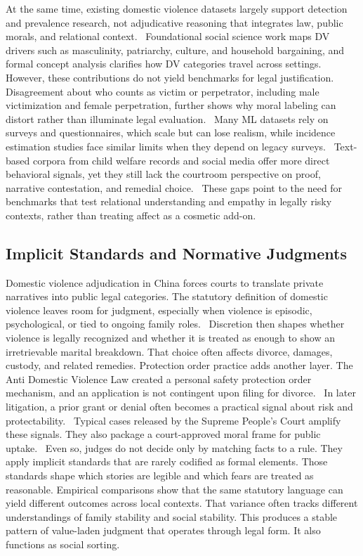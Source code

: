 \documentclass[pdflatex,sn-mathphys-ay]{sn-jnl}%
\theoremstyle{thmstyleone}%
\theoremstyle{thmstyletwo}%
\theoremstyle{thmstylethree}%
\begin{document}
At the same time, existing domestic violence datasets largely support detection and prevalence research, not adjudicative reasoning that integrates law, public morals, and relational context.~\cite{mshweshwe_understanding_2020} Foundational social science work maps DV drivers such as masculinity, patriarchy, culture, and household bargaining, and formal concept analysis clarifies how DV categories travel across settings. However, these contributions do not yield benchmarks for legal justification.~\cite{das_causes_2015} Disagreement about who counts as victim or perpetrator, including male victimization and female perpetration, further shows why moral labeling can distort rather than illuminate legal evaluation.~\cite{dutton_female_2005} Many ML datasets rely on surveys and questionnaires, which scale but can lose realism, while incidence estimation studies face similar limits when they depend on legacy surveys.~\cite{hossain_prediction_2021} Text-based corpora from child welfare records and social media offer more direct behavioral signals, yet they still lack the courtroom perspective on proof, narrative contestation, and remedial choice.~\cite{victor_automated_2021} These gaps point to the need for benchmarks that test relational understanding and empathy in legally risky contexts, rather than treating affect as a cosmetic add-on.

\subsection{Implicit Standards and Normative Judgments}\label{subsec2}
Domestic violence adjudication in China forces courts to translate private narratives into public legal categories. The statutory definition of domestic violence leaves room for judgment, especially when violence is episodic, psychological, or tied to ongoing family roles.~\cite{lin_worthy_2024} Discretion then shapes whether violence is legally recognized and whether it is treated as enough to show an irretrievable marital breakdown. That choice often affects divorce, damages, custody, and related remedies. Protection order practice adds another layer. The Anti Domestic Violence Law created a personal safety protection order mechanism, and an application is not contingent upon filing for divorce.~\cite{noauthor_anti_2016} In later litigation, a prior grant or denial often becomes a practical signal about risk and protectability.~\cite{zheng_challenges_2025} Typical cases released by the Supreme People's Court amplify these signals. They also package a court-approved moral frame for public uptake.~\cite{supreme_peoples_court_supreme_2025} Even so, judges do not decide only by matching facts to a rule. They apply implicit standards that are rarely codified as formal elements. Those standards shape which stories are legible and which fears are treated as reasonable. Empirical comparisons show that the same statutory language can yield different outcomes across local contexts. That variance often tracks different understandings of family stability and social stability. This produces a stable pattern of value-laden judgment that operates through legal form. It also functions as social sorting.~\cite{he_threat_2025}
\end{document}
